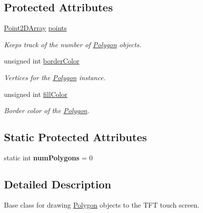 \subsection*{Protected Attributes}
\begin{DoxyCompactItemize}
\item 
\hypertarget{class_polygon_a3f17a85c09bd04138f22ae31d18b6b4d}{\hyperlink{class_point2_d_array}{Point2\+D\+Array} \hyperlink{class_polygon_a3f17a85c09bd04138f22ae31d18b6b4d}{points}}\label{class_polygon_a3f17a85c09bd04138f22ae31d18b6b4d}

\begin{DoxyCompactList}\small\item\em Keeps track of the number of \hyperlink{class_polygon}{Polygon} objects. \end{DoxyCompactList}\item 
\hypertarget{class_polygon_ac7e55927e6dda8a8ef0a9bf937564015}{unsigned int \hyperlink{class_polygon_ac7e55927e6dda8a8ef0a9bf937564015}{border\+Color}}\label{class_polygon_ac7e55927e6dda8a8ef0a9bf937564015}

\begin{DoxyCompactList}\small\item\em Vertices for the \hyperlink{class_polygon}{Polygon} instance. \end{DoxyCompactList}\item 
\hypertarget{class_polygon_a8785a91a1462e4fd02cff574e51f3948}{unsigned int \hyperlink{class_polygon_a8785a91a1462e4fd02cff574e51f3948}{fill\+Color}}\label{class_polygon_a8785a91a1462e4fd02cff574e51f3948}

\begin{DoxyCompactList}\small\item\em Border color of the \hyperlink{class_polygon}{Polygon}. \end{DoxyCompactList}\end{DoxyCompactItemize}
\subsection*{Static Protected Attributes}
\begin{DoxyCompactItemize}
\item 
\hypertarget{class_polygon_a2dc44114b25b8ee2351b3253ccf66376}{static int {\bfseries num\+Polygons} = 0}\label{class_polygon_a2dc44114b25b8ee2351b3253ccf66376}

\end{DoxyCompactItemize}


\subsection{Detailed Description}
Base class for drawing \hyperlink{class_polygon}{Polygon} objects to the T\+F\+T touch screen. 

